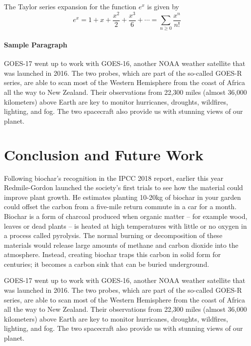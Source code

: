 \def\documentclass[sigconf]{acmart}
\begin{document}
The Taylor series expansion for the function $e^x$ is given by
\begin{equation}
e^x = 1 + x + \frac{x^2}{2} + \frac{x^3}{6} + \cdots = \sum_{n\geq 0} \frac{x^n}{n!}
\end{equation}

\paragraph{Sample Paragraph}
GOES-17 went up to work with GOES-16, another NOAA weather satellite that was launched in 2016. The two probes, which are part of the so-called GOES-R series, are able to scan most of the Western Hemisphere from the coast of Africa all the way to New Zealand. Their observations from 22,300 miles (almost 36,000 kilometers) above Earth are key to monitor hurricanes, droughts, wildfires, lighting, and fog. The two spacecraft also provide us with stunning views of our planet.

\section{Conclusion and Future Work}
Following biochar’s recognition in the IPCC 2018 report, earlier this year Redmile-Gordon launched the society’s first trials to see how the material could improve plant growth. He estimates planting 10-20kg of biochar in your garden could offset the carbon from a five-mile return commute in a car for a month. Biochar is a form of charcoal produced when organic matter – for example wood, leaves or dead plants – is heated at high temperatures with little or no oxygen in a process called pyrolysis. The normal burning or decomposition of these materials would release large amounts of methane and carbon dioxide into the atmosphere. Instead, creating biochar traps this carbon in solid form for centuries; it becomes a carbon sink that can be buried underground.

GOES-17 went up to work with GOES-16, another NOAA weather satellite that was launched in 2016. The two probes, which are part of the so-called GOES-R series, are able to scan most of the Western Hemisphere from the coast of Africa all the way to New Zealand. Their observations from 22,300 miles (almost 36,000 kilometers) above Earth are key to monitor hurricanes, droughts, wildfires, lighting, and fog. The two spacecraft also provide us with stunning views of our planet.

\end{document}
